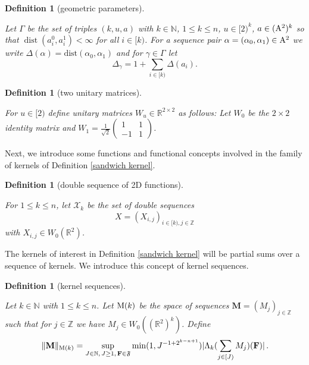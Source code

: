 \documentclass[12pt,reqno]{amsart}
\theoremstyle{plain}
\newtheorem{definition}[theorem]{Definition}
\numberwithin{equation}{section}
\theoremstyle{remark}
\newcommand{\uses}[1]{}
\newcommand{\usesdefs}[1]{}
\newcommand{\lean}[1]{}
\newcommand{\Z}{{\mathbb Z}}
\newcommand{\R}{{\mathbb R}}
\newcommand{\N}{{\mathbb N}}
\newcommand{\M}{\mathbf{M}}
\newcommand{\F}{\mathbf{F}}
\DeclareMathOperator{\dist}{dist}
\begin{document}
\begin{definition}[geometric parameters]\label{geometric parameters}\uses{}\usesdefs{multiplicatively spaced monotone sequences,Distance of spaced sequences}
\lean{Auto.GeometricParameters,Auto.sequencePairDistance,Auto.geometricDelta}
  Let $\Gamma$ be the set of triples $(k,u,a)$ with $k\in\N$, $1\le k\le n$, $u\in[2)^k$, $a\in ({\rm A}^{2})^k$  so that $\dist(a_{i}^0,a_{i}^1)<\infty$ for all $i\in [k)$.
  For a sequence pair $\alpha=(\alpha_0,\alpha_1)\in {\rm A}^2$ we write $\Delta(\alpha) = \mathrm{dist}(\alpha_{0}, \alpha_1)$
  and for $\gamma\in\Gamma$ let
  \begin{equation}\label{auto:sandwich-distance-sum} \Delta_\gamma= 1+\sum_{i\in [k)} \Delta(a_i). \end{equation}
\end{definition}

\begin{definition}[two unitary matrices]\label{auto:unitary-matrices-definition}\uses{}\usesdefs{}
\lean{Auto.W}
For $u\in [2)$ define unitary matrices $W_u\in\R^{2\times 2}$ as follows:
Let $W_0$ be the $2\times 2$ identity matrix and $W_1=\frac{1}{\sqrt{2}}\begin{pmatrix}1 & 1\\-1 & 1\end{pmatrix}$.
\end{definition}


Next, we introduce some functions and functional concepts involved in the family of kernels of Definition \ref{sandwich kernel}.


\begin{definition}[double sequence of 2D functions]\label{double sequence of 2D functions}\uses{}\usesdefs{auto:Wiener-space-definition}
\lean{Auto.DoubleSequence,Auto.MemDoubleSequence}
  For $1\le k\le n$, let $\mathcal{X}_k$ be the set of
  double sequences
  \begin{equation}\label{auto:sandwich-data-array}
      X=(X_{i,j})_{i\in [k),j\in \Z}
  \end{equation}
  with $X_{i,j}\in W_0(\R^2)$.
\end{definition}


The kernels of interest in Definition \ref{sandwich kernel} will be partial sums over a sequence of kernels.
We introduce this concept of kernel sequences.

\begin{definition}[kernel sequences]\label{kernel sequences}\uses{}\usesdefs{auto:Wiener-space-definition,normalized function tuples,auto:prism-form-definition}
\lean{Auto.KernelSequence,Auto.MemKernelSequence,Auto.kernelSequenceSeminorm}
Let $k\in\N$ with $1\le k\le n$. Let ${\rm M}(k)$ be the space of sequences $\M=(M_j)_{j\in \Z}$ such that for $j\in \Z$ we have
$M_j\in W_0((\R^2)^k)$. Define
\begin{equation}\label{auto:M-k-norm-definition}
\|\M\|_{{\rm M}(k)}=\sup_{J\in\N,\,J\ge1,\,\F\in\mathfrak F}\min(1,J^{-1+2^{k-n+1}}) |\Lambda_k(\sum_{j\in [J)} M_j)(\F)| \, .
\end{equation}
\end{definition}
\end{document}

